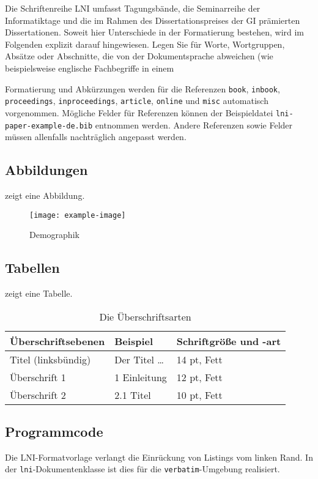 \documentclass[utf8,biblatex]{lni}
\begin{document}
Die Schriftenreihe LNI umfasst Tagungsbände, die Seminarreihe der Informatiktage und die im Rahmen des Dissertationspreises der GI prämierten Dissertationen. Soweit hier Unterschiede in der Formatierung bestehen, wird im Folgenden explizit darauf hingewiesen. Legen Sie für Worte, Wortgruppen, Absätze oder Abschnitte, die von der Dokumentsprache abweichen (wie beispielsweise englische Fachbegriffe in einem 

Formatierung und Abkürzungen werden für die Referenzen \texttt{book}, \texttt{inbook}, \texttt{proceedings}, \texttt{inproceedings}, \texttt{article}, \texttt{online} und \texttt{misc} automatisch vorgenommen.
Mögliche Felder für Referenzen können der Beispieldatei \texttt{lni-paper-example-de.bib} entnommen werden.
Andere Referenzen sowie Felder müssen allenfalls nachträglich angepasst werden.

\subsection{Abbildungen}
 zeigt eine Abbildung.

\begin{figure}
  \centering
  \texttt{[image: example-image]}
  \caption{Demographik}
  \label{fig:demo}
\end{figure}

\subsection{Tabellen}
 zeigt eine Tabelle.

\begin{table}
\centering
\begin{tabular}{lll}
\toprule
Überschriftsebenen & Beispiel & Schriftgröße und -art \\
\midrule
Titel (linksbündig) & Der Titel \ldots & 14 pt, Fett\\
Überschrift 1 & 1 Einleitung & 12 pt, Fett\\
Überschrift 2 & 2.1 Titel & 10 pt, Fett\\
\bottomrule
\end{tabular}
\caption{Die Überschriftsarten}
\label{tab:demo}
\end{table}

\subsection{Programmcode}
Die LNI-Formatvorlage verlangt die Einrückung von Listings vom linken Rand.
In der \texttt{lni}-Dokumentenklasse ist dies für die \texttt{verbatim}-Umgebung realisiert.
\end{document}
